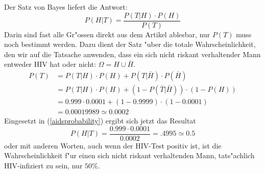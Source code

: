 Der Satz von Bayes liefert die Antwort:
\begin{equation}
P(H|T)=\frac{P(T|H)\cdot P(H)}{P(T)}
\label{aidsprobability}
\end{equation}
Darin sind fast alle Gr"ossen direkt aus dem Artikel ablesbar, nur $P(T)$ muss
noch bestimmt werden.
Dazu dient der Satz "uber die totale Wahrscheinlichkeit,
den wir auf die Tatsache anwenden, dass ein sich nicht riskant verhaltender
Mann entweder HIV hat oder nicht: $\Omega=H\cup \bar H$.
\begin{align*}
P(T)
&=P(T|H)\cdot P(H)+P(T|\bar H)\cdot P(\bar H)\\
&=P(T|H)\cdot P(H)+(1-P(\bar T|\bar H))\cdot (1 - P(H))\\
&=0.999\cdot 0.0001+(1-0.9999)\cdot(1-0.0001)\\
&=0.00019989\simeq 0.0002
\end{align*}
Eingesetzt in (\ref{aidsprobability}) ergibt sich jetzt das Resultat
\[
P(H|T)=\frac{0.999\cdot 0.0001}{0.0002}=.4995\simeq 0.5
\]
oder mit anderen Worten, auch wenn der HIV-Test positiv ist, ist
die Wahrscheinlichkeit f"ur einen sich nicht riskant verhaltenden Mann,
tats"achlich HIV-infiziert zu sein, nur $50\%$.

